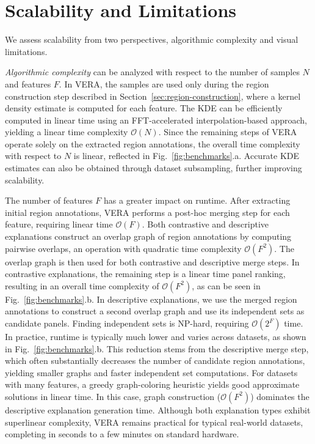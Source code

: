 \documentclass[lettersize,journal]{IEEEtran}
\begin{document}
\section{Scalability and Limitations}
\label{sec:scalability}

We assess scalability from two perspectives, algorithmic complexity and visual limitations.

\textit{Algorithmic complexity} can be analyzed with respect to the number of samples $N$ and features $F$.
In VERA, the samples are used only during the region construction step described in Section~\ref{sec:region-construction}, where a kernel density estimate is computed for each feature. The KDE can be efficiently computed in linear time using an FFT-accelerated interpolation-based approach, yielding a linear time complexity $\mathcal{O}(N)$.
Since the remaining steps of VERA operate solely on the extracted region annotations, the overall time complexity with respect to $N$ is linear, reflected in Fig.~\ref{fig:benchmarks}.a. Accurate KDE estimates can also be obtained through dataset subsampling, further improving scalability.

The number of features $F$ has a greater impact on runtime.
After extracting initial region annotations, VERA performs a post-hoc merging step for each feature, requiring linear time $\mathcal{O}(F)$.
Both contrastive and descriptive explanations construct an overlap graph of region annotations by computing pairwise overlaps, an operation with quadratic time complexity $\mathcal{O}(F^2)$. The overlap graph is then used for both contrastive and descriptive merge steps.
In contrastive explanations, the remaining step is a linear time panel ranking, resulting in an overall time complexity of $\mathcal{O}(F^2)$, as can be seen in Fig.~\ref{fig:benchmarks}.b.
In descriptive explanations, we use the merged region annotations to construct a second overlap graph and use its independent sets as candidate panels. Finding independent sets is NP-hard, requiring $\mathcal{O}(2^F)$ time.
In practice, runtime is typically much lower and varies across datasets, as shown in Fig.~\ref{fig:benchmarks}.b.
This reduction stems from the descriptive merge step, which often substantially decreases the number of candidate region annotations, yielding smaller graphs and faster independent set computations.
For datasets with many features, a greedy graph-coloring heuristic yields good approximate solutions in linear time. In this case, graph construction ($\mathcal{O}(F^2)$) dominates the descriptive explanation generation time.
Although both explanation types exhibit superlinear complexity, VERA remains practical for typical real-world datasets, completing in seconds to a few minutes on standard hardware. 
\end{document}
